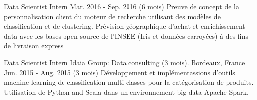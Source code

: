 \begin{cventries}
  \cventry
    {Data Scientist Intern} %
    {} %
    {} %
    {Mar. 2016 - Sep. 2016 (6 mois)} %
    {
    Preuve de concept de la personnalisation client du moteur de recherche utilisant des modèles de classification et de clustering.\newline
    Prévision géographique d'achat et enrichissement data avec les bases open source de l'INSEE (Iris et données carroyées) à des fins de livraison express.
    }

  \cventry
    {Data Scientist Intern} %
    {Idaia Group: Data consulting (3 mois).} %
    {Bordeaux, France} %
    {Jun. 2015 - Aug. 2015 (3 mois)} %
    {
    Développement et implémentassions d'outils machine learning de classification multi-classes pour la catégorisation de produits.\newline
    Utilisation de Python and Scala dans un environnement big data Apache Spark.
    }

\end{cventries}
